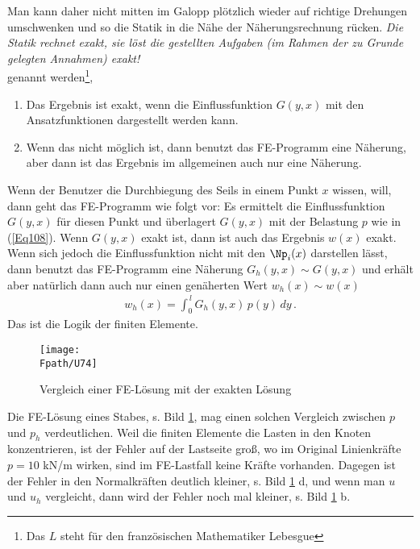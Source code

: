 {{{{Man kann daher nicht mitten im Galopp pl\"{o}tzlich wieder auf richtige Drehungen umschwenken und so die Statik in die N\"{a}he der N\"{a}herungsrechnung r\"{u}cken. {\em Die Statik rechnet exakt, sie l\"{o}st die gestellten Aufgaben (im Rahmen der zu Grunde gelegten Annahmen) exakt!\/}\\

 genannt werden\footnote{Das $L$ steht f\"{u}r den franz\"{o}sischen Mathematiker Lebesgue},

 \begin{enumerate}
\item Das Ergebnis ist exakt, wenn die Einflussfunktion $G(y,x)$ mit den Ansatzfunktionen dargestellt werden kann.
\item Wenn das nicht m\"{o}glich ist, dann benutzt das FE-Programm eine N\"{a}herung, aber dann ist das Ergebnis im allgemeinen auch nur eine N\"{a}herung.
\end{enumerate}
Wenn der Benutzer die Durchbiegung des Seils in einem Punkt $x$ wissen, will, dann geht das FE-Programm wie folgt vor: Es ermittelt die Einflussfunktion $G(y,x)$ f\"{u}r diesen Punkt und \"{u}berlagert $G(y,x)$ mit der Belastung $p$ wie in (\ref{Eq108}). Wenn $G(y,x)$ exakt ist, dann ist auch das Ergebnis $w(x)$ exakt. Wenn sich jedoch die Einflussfunktion nicht mit den $\Np_i(x)$ darstellen l\"{a}sst, dann benutzt das FE-Programm eine N\"{a}herung $G_h(y,x) \sim G(y,x)$ und erh\"{a}lt aber nat\"{u}rlich dann auch nur einen gen\"{a}herten Wert $w_h(x) \sim w(x)$
\begin{align}
w_h(x) = \int_0^{\,l} G_h(y,x)\,p(y)\,dy\,.
\end{align}
Das ist die Logik der finiten Elemente.
\\
\begin{figure}[tbp]
\centering
\if {} \sidecaption \fi
\texttt{[image: \\Fpath/U74]}
\caption{Vergleich einer FE-L\"{o}sung mit der exakten L\"{o}sung} \label{U74}
\end{figure}%
Die FE-L\"{o}sung eines Stabes, s. Bild \ref{U74}, mag einen solchen Vergleich zwischen $p$ und $p_h$ verdeutlichen. Weil die finiten Elemente die Lasten in den Knoten konzentrieren, ist der Fehler auf der Lastseite gro{\ss}, wo im Original Linienkr\"{a}fte $p = 10$ kN/m wirken, sind im FE-Lastfall keine Kr\"{a}fte vorhanden. Dagegen ist der Fehler in den Normalkr\"{a}ften deutlich kleiner, s. Bild \ref{U74} d, und wenn man $u$ und $u_h$ vergleicht, dann wird der Fehler noch mal kleiner,  s. Bild \ref{U74} b. \\

}}}}
